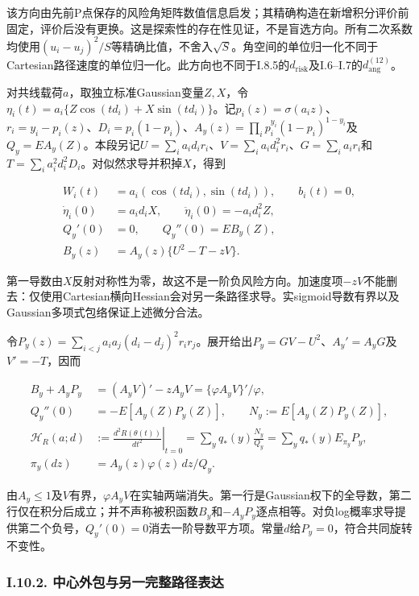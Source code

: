 \documentclass[11pt,a4paper]{article}
\begin{document}
该方向由先前P点保存的风险角矩阵数值信息启发；其精确构造在新增积分评价前固定，评价后没有更换。这是探索性的存在性见证，不是盲选方向。所有二次系数均使用\((u_i-u_j)^2/S\)等精确比值，不舍入\(\sqrt S\)。角空间的单位归一化不同于Cartesian路径速度的单位归一化。此方向也不同于I.8.5的\(d_{\mathrm{risk}}\)及I.6--I.7的\(d_{\mathrm{ang}}^{(12)}\)。

对共线载荷\(a\)，取独立标准Gaussian变量\(Z,X\)，令\(\eta_i(t)=a_i\{Z\cos(td_i)+X\sin(td_i)\}\)。记\(p_i(z)=\sigma(a_i z)\)、\(r_i=y_i-p_i(z)\)、\(D_i=p_i(1-p_i)\)、\(A_y(z)=\prod_i p_i^{y_i}(1-p_i)^{1-y_i}\)及\(Q_y=E A_y(Z)\)。本段另记\(U=\sum_i a_i d_i r_i\)、\(V=\sum_i a_i d_i^2r_i\)、\(G=\sum_i a_i r_i\)和\(T=\sum_i a_i^2d_i^2D_i\)。对似然求导并积掉\(X\)，得到

\[
\begin{aligned}
W_i(t)&=a_i(\cos(td_i),\sin(td_i)),\qquad b_i(t)=0,\\
\dot\eta_i(0)&=a_i d_iX,\qquad \ddot\eta_i(0)=-a_i d_i^2Z,\\
Q_y'(0)&=0,\qquad Q_y''(0)=E B_y(Z),\\
B_y(z)&=A_y(z)\{U^2-T-zV\}.
\end{aligned}
\tag{I.47}
\]

第一导数由\(X\)反射对称性为零，故这不是一阶负风险方向。加速度项\(-zV\)不能删去：仅使用Cartesian横向Hessian会对另一条路径求导。实sigmoid导数有界以及Gaussian多项式包络保证上述微分合法。

令\(P_y(z)=\sum_{i<j}a_ia_j(d_i-d_j)^2r_ir_j\)。展开给出\(P_y=GV-U^2\)、\(A_y'=A_yG\)及\(V'=-T\)，因而

\[
\begin{aligned}
B_y+A_yP_y&=(A_yV)'-zA_yV
=\{\varphi A_yV\}'/\varphi,\\
Q_y''(0)&=-E[A_y(Z)P_y(Z)],\qquad N_y:=E[A_y(Z)P_y(Z)],\\
\mathcal H_R(a;d)&:=\left.\frac{d^2R(\theta(t))}{dt^2}\right|_{t=0}
=\sum_yq_*(y)\frac{N_y}{Q_y}
=\sum_yq_*(y)E_{\pi_y}P_y,\\
\pi_y(dz)&=A_y(z)\varphi(z)\,dz/Q_y.
\end{aligned}
\tag{I.48}
\]

由\(A_y\le1\)及\(V\)有界，\(\varphi A_yV\)在实轴两端消失。第一行是Gaussian权下的全导数，第二行仅在积分后成立；并不声称被积函数\(B_y\)和\(-A_yP_y\)逐点相等。对负log概率求导提供第二个负号，\(Q_y'(0)=0\)消去一阶导数平方项。常量\(d\)给\(P_y=0\)，符合共同旋转不变性。

\subsubsection*{I.10.2.
中心外包与另一完整路径表达}\label{i.10.2.-ux4e2dux5fc3ux5916ux5305ux4e0eux53e6ux4e00ux5b8cux6574ux8defux5f84ux8868ux8fbe}
\end{document}
